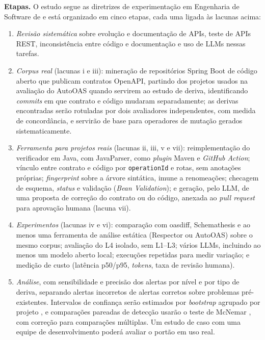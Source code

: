 \documentclass[12pt]{article}
\newcommand{\code}[1]{\texttt{#1}}
\begin{document}
\textbf{Etapas.} O estudo segue as diretrizes de experimentação em Engenharia de Software de \cite{wohlin2012experimentation} e está organizado em cinco etapas, cada uma ligada às lacunas acima:
\begin{enumerate}[noitemsep, topsep=3pt, leftmargin=1.5em]
  \item \textit{Revisão sistemática} \cite{kitchenham2007slr} sobre evolução e documentação de APIs, teste de APIs REST, inconsistência entre código e documentação e uso de LLMs nessas tarefas.
  \item \textit{Corpus real} (lacunas i e iii): mineração de repositórios Spring Boot de código aberto que publicam contratos OpenAPI, partindo dos projetos usados na avaliação do AutoOAS \cite{lercher2024autooas} quando servirem ao estudo de deriva, identificando \textit{commits} em que contrato e código mudaram separadamente; as derivas encontradas serão rotuladas por dois avaliadores independentes, com medida de concordância, e servirão de base para operadores de mutação gerados sistematicamente.
  \item \textit{Ferramenta para projetos reais} (lacunas ii, iii, v e vii): reimplementação do verificador em Java, com JavaParser, como \textit{plugin} Maven e \textit{GitHub Action}; vínculo entre contrato e código por \code{operationId} e rotas, sem anotações próprias; \textit{fingerprint} sobre a árvore sintática, imune a renomeações; checagem de esquema, \textit{status} e validação (\textit{Bean Validation}); e geração, pelo LLM, de uma proposta de correção do contrato ou do código, anexada ao \textit{pull request} para aprovação humana (lacuna vii).
  \item \textit{Experimentos} (lacunas iv e vi): comparação com oasdiff, Schemathesis e ao menos uma ferramenta de análise estática (Respector ou AutoOAS) sobre o mesmo corpus; avaliação do L4 isolado, sem L1--L3; vários LLMs, incluindo ao menos um modelo aberto local; execuções repetidas para medir variação; e medição de custo (latência p50/p95, \textit{tokens}, taxa de revisão humana).
  \item \textit{Análise}, com sensibilidade e precisão dos alertas por nível e por tipo de deriva, separando alertas incorretos de alertas corretos sobre problemas pré-existentes. Intervalos de confiança serão estimados por \textit{bootstrap} agrupado por projeto \cite{efron1993bootstrap}, e comparações pareadas de detecção usarão o teste de McNemar \cite{mcnemar1947}, com correção para comparações múltiplas. Um estudo de caso com uma equipe de desenvolvimento \cite{runeson2009casestudy} poderá avaliar o portão em uso real.
\end{enumerate}
\end{document}
